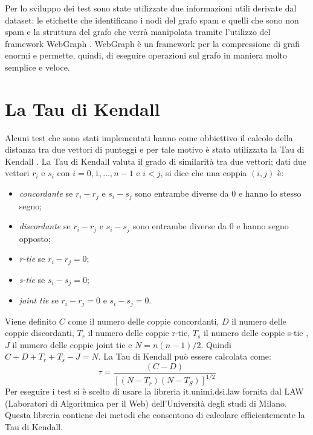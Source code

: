 Per lo sviluppo dei test sono state utilizzate due informazioni utili derivate dal dataset: le etichette che identificano i nodi del grafo spam e quelli che sono non spam e la struttura del grafo che verrà manipolata tramite l'utilizzo del framework WebGraph \cite{Boldi03thewebgraph}. WebGraph è un framework per la compressione di grafi enormi e permette, quindi, di eseguire operazioni sul grafo in maniera molto semplice e veloce. 

\section{La Tau di Kendall}
Alcuni test che sono stati implementati hanno come obbiettivo il calcolo della distanza tra due vettori di punteggi e per tale motivo è stata utilizzata la Tau di Kendall \cite{KendallTau}. La Tau di Kendall valuta il grado di similarità tra due vettori; dati due vettori \(r_i\) e \(s_i\) con \(i=0,1,...,n-1\) e \(i<j\), si dice che una coppia \((i,j)\) è:
\begin{itemize}
 \item \textit{concordante} se \(r_i-r_j\) e \(s_i-s_j\) sono entrambe diverse da 0 e hanno lo stesso segno;
 \item \textit{discordante} se \(r_i-r_j\) e \(s_i-s_j\) sono entrambe diverse da 0 e hanno segno opposto;
 \item \textit{r-tie} se \(r_i-r_j=0\);
 \item \textit{s-tie} se \(s_i-s_j=0\);
 \item \textit{joint tie} se \(r_i-r_j=0\) e \(s_i-s_j=0\).
\end{itemize}
Viene definito  \(C\) come il numero delle coppie concordanti, \(D\) il numero delle coppie discordanti, \(T_r\) il numero delle coppie r-tie, \(T_s\) il numero delle coppie s-tie ,\(J\) il numero delle coppie joint tie e \(N=n(n-1)/2\). Quindi \(C+D+T_r+T_s-J = N\). La Tau di Kendall può essere calcolata come:
\begin{equation}
 \tau = \frac{(C-D)}{[(N-T_r)(N-T_S)]^{1/2}}
\end{equation}
Per eseguire i test si è scelto di usare la libreria  it.unimi.dsi.law \cite{libreriaLaw} fornita dal LAW (Laboratori di Algoritmica per il Web) dell'Università degli studi di Milano. Questa libreria contiene dei metodi che consentono di calcolare efficientemente la Tau di Kendall.

